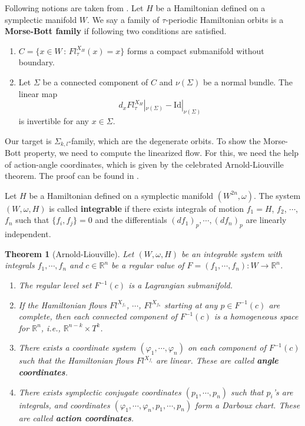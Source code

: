 \documentclass{amsart}
\newcommand{\R}{\mathbb{R}}
\renewcommand{\o}{\omega}
\newcommand{\Id}{\mathrm{Id}}
\newcommand{\vp}{\varphi}
\newtheorem{thm}{Theorem}[section]
\begin{document}
Following notions are taken from \cite{Kwon_van_Koert_16}.
Let $H$ be a Hamiltonian defined on a symplectic manifold $W$.
We say a family of $\tau$-periodic Hamiltonian orbits is a \textbf{Morse-Bott family} if following two conditions are satisfied.
	\begin{enumerate}
		\item $C=\{x\in W\,:\,Fl^{X_H}_\tau(x)=x\}$ forms a compact submanifold without boundary.
		\item Let $\Sigma$ be a connected component of $C$ and $\nu(\Sigma)$ be a normal bundle.
		The linear map
			$$
			d_x Fl^{X_H}_\tau|_{\nu(\Sigma)}-\Id|_{\nu(\Sigma)}
			$$
		is invertible for any $x\in \Sigma$.
	\end{enumerate}
Our target is $\Sigma_{k,l}$-family, which are the degenerate orbits.
To show the Morse-Bott property, we need to compute the linearized flow.
For this, we need the help of action-angle coordinates, which is given by the celebrated Arnold-Liouville theorem.
The proof can be found in \cite{Arnold_89}.

Let $H$ be a Hamiltonian defined on a symplectic manifold $(W^{2n},\o)$.
The system $(W,\o,H)$ is called \textbf{integrable} if there exists integrals of motion $f_1=H$, $f_2$, $\cdots$, $f_n$ such that $\{f_i,f_j\}=0$ and the differentials $(df_1)_p,\cdots,(df_n)_p$ are linearly independent.

\begin{thm}[Arnold-Liouville]
	Let $(W,\o,H)$ be an integrable system with integrals $f_1,\cdots,f_n$ and $c\in\R^n$ be a regular value of $F=(f_1,\cdots,f_n):W\to\R^n$.
	\begin{enumerate}
		\item The regular level set $F^{-1}(c)$ is a Lagrangian submanifold.
		\item If the Hamiltonian flows $Fl^{X_{f_1}}$, $\cdots$, $Fl^{X_{f_n}}$ starting at any $p\in F^{-1}(c)$ are complete, then each connected component of $F^{-1}(c)$ is a homogeneous space for $\R^n$, i.e., $\R^{n-k}\times T^k$.
		\item There exists a coordinate system $(\vp_1,\cdots,\vp_n)$ on each component of $F^{-1}(c)$ such that the Hamiltonian flows $Fl^{X_{f_i}}$ are linear.
		These are called \textbf{angle coordinates}.
		\item There exists symplectic conjugate coordinates $(p_1,\cdots,p_n)$ such that $p_i$'s are integrals, and coordinates $(\vp_1,\cdots,\vp_n,p_1,\cdots,p_n)$ form a Darboux chart.
		These are called \textbf{action coordinates}.
	\end{enumerate}
\end{thm}
\end{document}
